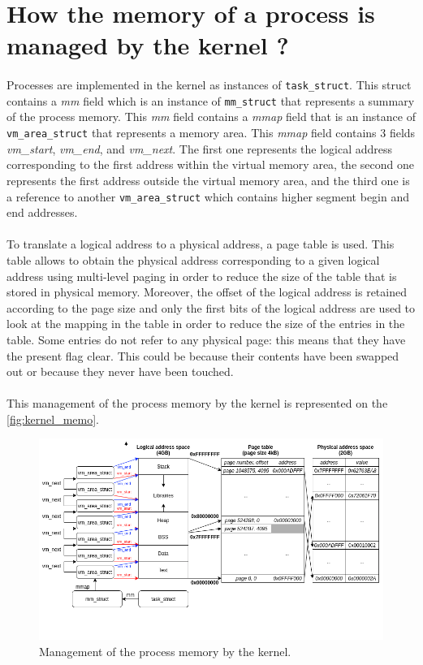 \documentclass[a4paper, 11pt, oneside]{article}
\begin{document}
\section{How the memory of a process is managed by the kernel ?}\label{section2}

\paragraph{}Processes are implemented in the kernel as instances of \texttt{task\_struct}. 
This struct contains a \textit{mm} field which is an instance of \texttt{mm\_struct} that represents a 
summary of the process memory. This \textit{mm} field contains a \textit{mmap} field that is an instance of \texttt{vm\_area\_struct} that represents 
a memory area. This \textit{mmap} field contains 3 fields \textit{vm\_start}, \textit{vm\_end}, and \textit{vm\_next}. The first one represents the logical 
address corresponding to the first address within the virtual memory area, the second one represents the first address outside the virtual memory area, and the 
third one is a reference to another \texttt{vm\_area\_struct} which contains higher segment begin and end addresses. 

\paragraph{}To translate a logical address to a physical address, a page table is used. This table allows 
to obtain the physical address corresponding to a given logical address using multi-level paging in order to reduce the size of the table that is stored in physical memory.
Moreover, the offset of the logical address is retained according to the page size and only the first bits of the logical address are used to look at the mapping in the table in order to 
reduce the size of the entries in the table. Some entries do not refer to any physical page: this means that they have the present flag clear. This could be because their contents have been swapped out or because they never have been touched.

\paragraph{}This management of the process memory by the kernel is represented on the \autoref{fig:kernel_memo}.
\begin{figure}[H]
  \centering
  \includegraphics[scale=0.6]{kernel_memo.png}
  \caption{Management of the process memory by the kernel.}\label{fig:kernel_memo}
\end{figure}
\end{document}
